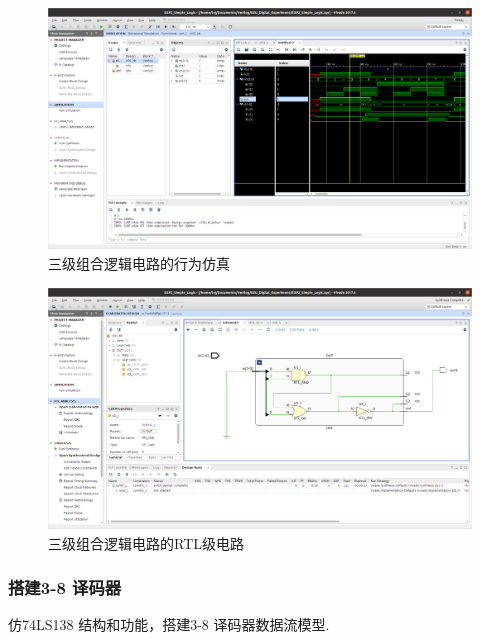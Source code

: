 \documentclass[11pt]{SEU-Digital-Report}
\begin{document}
                \begin{figure}[htbp]
                    \includegraphics[width=\linewidth]{fig/vivado/1_simu.png}
                    \caption{三级组合逻辑电路的行为仿真}
                    \label{fig:vivado_1_simu}
                \end{figure}

                \begin{figure}[htbp]
                    \includegraphics[width=\linewidth]{fig/vivado/1_RTL.png}
                    \caption{三级组合逻辑电路的RTL级电路}
                    \label{fig:vivado_1_RTL}
                \end{figure}


            \newpage

            \subsubsection{搭建3-8 译码器}

                仿74LS138 结构和功能，搭建3-8
                译码器数据流模型.
\end{document}
